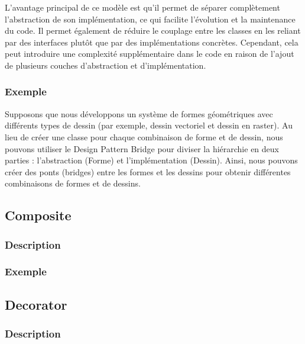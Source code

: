 \documentclass[french]{article}
\begin{document}
L'avantage principal de ce modèle est qu'il permet de séparer complètement l'abstraction de son implémentation, ce qui facilite l'évolution et la maintenance du code. Il permet également de réduire le couplage entre les classes en les reliant par des interfaces plutôt que par des implémentations concrètes. Cependant, cela peut introduire une complexité supplémentaire dans le code en raison de l'ajout de plusieurs couches d'abstraction et d'implémentation.


\subsubsection{Exemple}

Supposons que nous développons un système de formes géométriques avec différents types de dessin (par exemple, dessin vectoriel et dessin en raster). Au lieu de créer une classe pour chaque combinaison de forme et de dessin, nous pouvons utiliser le Design Pattern Bridge pour diviser la hiérarchie en deux parties : l'abstraction (Forme) et l'implémentation (Dessin). Ainsi, nous pouvons créer des ponts (bridges) entre les formes et les dessins pour obtenir différentes combinaisons de formes et de dessins.






\subsection{Composite}

\subsubsection{Description}




\subsubsection{Exemple}



\subsection{Decorator}

\subsubsection{Description}
\end{document}
